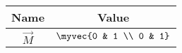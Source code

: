 \begin{tabular}{|c|c|}
\hline
\textbf{Name} & \textbf{Value} \\ \hline
$\vec{M}$ & $\myvec{0 & 1 \\ 0 & 1}$ \\ \hline
\end{tabular}
